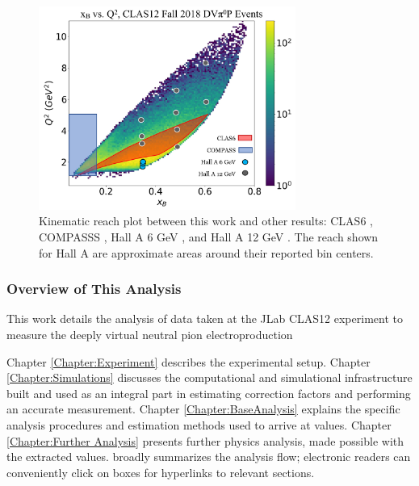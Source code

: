      
        \begin{figure}[H]
            \centering
            \includegraphics[width=0.75\textwidth]{Chapters/Ch1-Intro/Ch1-Sec2-GPDs-DVMP/pics/kinematic_overlap.png}
            \caption[Kinematic Reach Comparison]{Kinematic reach plot between this work and other results:  CLAS6 \parencite{Bedlinskiy2014ExclusiveCLAS}, COMPASSS \parencite{Alexeev2020MeasurementProton}, Hall A 6 GeV \parencite{Fuchey2011ExclusiveRegime}, and Hall A 12 GeV \parencite{Dlamini2021DeepRegime}. The reach shown for Hall A are approximate areas around their reported bin centers. }
            \label{fig:kinematicreach}
        \end{figure}

        \subsubsection*{Overview of This Analysis}\label{sec:anaflow}
    
    
        This work details the analysis of data taken at the JLab CLAS12 experiment to measure the deeply virtual neutral pion electroproduction \xsecp
        
        
        Chapter \ref{Chapter:Experiment} describes the experimental setup. Chapter \ref{Chapter:Simulations} discusses the computational and simulational infrastructure built and used as an integral part in estimating correction factors and performing an accurate measurement. Chapter \ref{Chapter:BaseAnalysis} explains the specific analysis procedures and estimation methods used to arrive at \xsec values. Chapter \ref{Chapter:Further Analysis} presents further physics analysis, made possible with the extracted \xsec values.  broadly summarizes the analysis flow; electronic readers can conveniently click on boxes for hyperlinks to relevant sections. 

